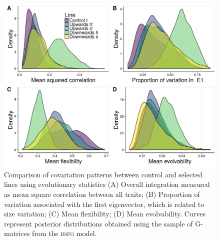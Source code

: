 \begin{refsection}
\begin{figure}
\centering
\includegraphics[width = 12cm]{chapter_ratones/media/SI/figureS9_Fig3Gversion.png}
\caption[G-matrix evolutionary statistics]{Comparison of covariation patterns between control and selected lines using evolutionary statistics (A) Overall integration measured as mean square correlation between all traits; (B) Proportion of variation associated with the first eigenvector, which is related to size variation; (C) Mean flexibility; (D) Mean evolvability. Curves represent posterior distributions obtained using the sample of G-matrices from the \textsc{bsfg} model.}
\label{figsup:matstatG}
\end{figure}


\end{refsection}
